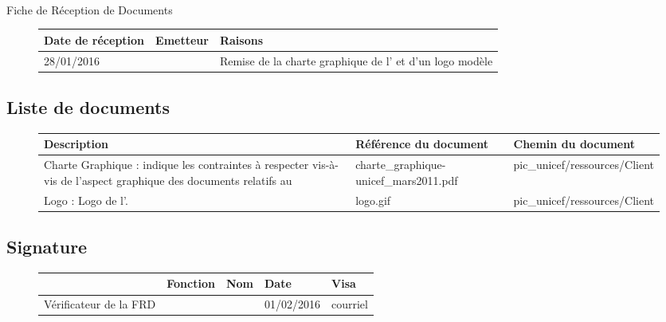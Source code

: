 \documentclass[asi, sansVersion]{picINSA}
\begin{document}
\begin{center}
\huge
\nomEquipe{}\\
Fiche de Réception de Documents\\
\end{center}
\vspace{0.5cm}


\begin{figure}[H]
		\centering
		\begin{tabularx}{17cm}{|X|X|X|}
		\hline
		\rowcolor[gray]{0.85}Date de réception & Emetteur & Raisons \\
		\hline
		28/01/2016 & \nomClient{} & Remise de la charte graphique de l'\nomClient{} et d'un logo modèle\\
		\hline
		\end{tabularx}
\end{figure}

\subsection*{Liste de documents}

\begin{figure}[H]
		\centering
		\begin{tabularx}{17cm}{|X|X|X|}
		\hline
		\rowcolor[gray]{0.85} Description & Référence du document & Chemin du document\\
		\hline
		Charte Graphique : indique les contraintes à respecter vis-à-vis de l'aspect graphique des documents relatifs au \Client{} & charte\_graphique-unicef\_mars2011.pdf & pic\_unicef/ressources/Client \\
		\hline
		Logo \nomClient{} : Logo de l'\nomClient. & logo.gif & pic\_unicef/ressources/Client\\
		\hline
		\end{tabularx}
\end{figure}

\subsection*{Signature}

\begin{figure}[H]
		\centering
		\begin{tabularx}{17cm}{|p{4cm}|X|X|X|X|}
		\hline
		\rowcolor[gray]{0.85}& Fonction & Nom & Date & Visa \\
		\hline
		 Vérificateur de la FRD & \RGC & \Mathieu & 01/02/2016 & courriel \\
		\hline
		\end{tabularx}
\end{figure}
\end{document}
